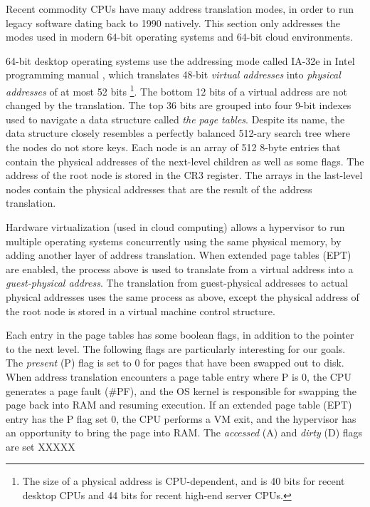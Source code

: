 Recent commodity CPUs have many address translation modes, in order to run
legacy software dating back to 1990 natively. This section only addresses the
modes used in modern 64-bit operating systems and 64-bit cloud environments.

64-bit desktop operating systems use the addressing mode called IA-32e in
Intel programming manual \cite{intel2013manual}, which translates 48-bit
\textit{virtual addresses} into \textit{physical addresses} of at most 52 bits
\footnote{The size of a physical address is CPU-dependent, and is 40 bits for
recent desktop CPUs and 44 bits for recent high-end server CPUs.}. The bottom
12 bits of a virtual address are not changed by the translation. The top 36
bits are grouped into four 9-bit indexes used to navigate a data structure
called \textit{the page tables}. Despite its name, the data structure closely
resembles a perfectly balanced 512-ary search tree where the nodes do not store
keys. Each node is an array of 512 8-byte entries that contain the physical
addresses of the next-level children as well as some flags. The address of the
root node is stored in the CR3 register. The arrays in the last-level nodes
contain the physical addresses that are the result of the address translation.

Hardware virtualization (used in cloud computing) allows a hypervisor to run
multiple operating systems concurrently using the same physical memory, by
adding another layer of address translation. When extended page tables (EPT)
are enabled, the process above is used to translate from a virtual address into
a \textit{guest-physical address}. The translation from guest-physical
addresses to actual physical addresses uses the same process as above, except
the physical address of the root node is stored in a virtual machine control
structure.

Each entry in the page tables has some boolean flags, in addition to the
pointer to the next level. The following flags are particularly interesting for
our goals. The \textit{present} (P) flag is set to 0 for pages that have been
swapped out to disk. When address translation encounters a page table entry
where P is 0, the CPU generates a page fault (\#PF), and the OS kernel is
responsible for swapping the page back into RAM and resuming execution. If
an extended page table (EPT) entry has the P flag set 0, the CPU performs a VM
exit, and the hypervisor has an opportunity to bring the page into RAM. The
\textit{accessed} (A) and \textit{dirty} (D) flags are set  XXXXX


